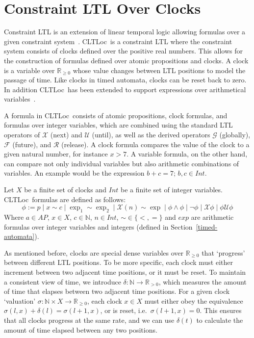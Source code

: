 \documentclass[a4paper,11pt]{report}
\newcommand*\BitOr{\mathbin{|}}
\theoremstyle{definition}
\newcommand{\cltloc}{CLTLoc}
\begin{document}
\section{Constraint LTL Over Clocks}\label{cltloc}

Constraint LTL is an extension of linear temporal logic allowing formulas over a
given constraint system~\cite{demri07}. \cltloc\ is a constraint LTL where the
constraint system consists of clocks defined over the positive real numbers.
This allows for the construction of formulas defined over atomic propositions
and clocks. A clock is a variable over \(\mathbb{R}_{\geq 0}\) whose value
changes between LTL positions to model the passage of time. Like clocks in timed
automata, clocks can be reset back to zero. In addition \cltloc\ has been
extended to support expressions over arithmetical variables~\cite{marconi16}.

A formula in \cltloc\ consists of atomic propositions, clock formulas, and
formulas over integer variables, which are combined using the standard LTL
operators of \(\mathcal{X}\) (next) and \(\mathcal{U}\) (until), as well as the
derived operators \(\mathcal{G}\) (globally), \(\mathcal{F}\) (future), and
\(\mathcal{R}\) (release). A clock formula compares the value of the clock to a
given natural number, for instance \(x > 7\). A variable formula, on the other
hand, can compare not only individual variables but also arithmetic combinations
of variables. An example would be the expression \(b + c = 7\); \(b,c \in Int\).

Let \(X\) be a finite set of clocks and \(Int\) be a finite set of integer
variables. \cltloc\ formulas are defined as follows:
\[\phi := p \BitOr x \sim c \BitOr \exp_{1} \sim \exp_{2} \BitOr \mathcal{X}(n) \sim \exp \BitOr \phi \land \phi \BitOr \neg \phi \BitOr \mathcal{X}\phi \BitOr \phi \mathcal{U} \phi \]
Where \(a \in AP\), \(x \in X\), \(c \in \mathbb{N}\), \(n \in Int\),
$\sim \in \{<,=\} $ and \(exp\) are arithmetic formulas over integer variables
and integers (defined in Section~\ref{timed-automata}).

As mentioned before, clocks are special dense variables over
\(\mathbb{R}_{\geq 0}\) that `progress' between different LTL positions. To be
more specific, each clock must either increment between two adjacent time
positions, or it must be reset. To maintain a consistent view of time, we
introduce \(\delta: \mathbb{N} \rightarrow \mathbb{R}_{>0}\), which measures the
amount of time that elapses between two adjacent time positions. For a given
clock `valuation'
\(\sigma: \mathbb{N} \times X \rightarrow \mathbb{R}_{\geq 0}\), each clock
\(x \in X\) must either obey the equivalence
\(\sigma(l,x) + \delta(l) = \sigma(l+1,x)\), or is reset, i.e.\
\(\sigma(l+1,x) = 0\). This ensures that all clocks progress at the same rate,
and we can use \(\delta(t)\) to calculate the amount of time elapsed between any
two positions.
\end{document}
